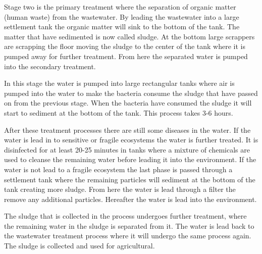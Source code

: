 Stage two is the primary treatment where the separation of organic matter (human waste) from the wastewater. By leading the wastewater into a large settlement tank the organic matter will sink to the bottom of the tank. The matter that have sedimented is now called sludge. At the bottom large scrappers are scrapping the floor moving the sludge to the center of the tank where it is pumped away for further treatment. From here the separated water is pumped into the secondary treatment. 

In this stage the water is pumped into large rectangular tanks where air is pumped into the water to make the bacteria consume the sludge that have passed on from the previous stage. When the bacteria have consumed the sludge it will start to sediment at the bottom of the tank. This process takes 3-6 hours.  

After these treatment processes there are still some diseases in the water. If the water is lead in to sensitive or fragile ecosystems the water is further treated. It is disinfected for at least 20-25 minutes in tanks where a mixture of chemicals are used to cleanse the remaining water before leading it into the environment. If the water is not lead to a fragile ecosystem the last phase is passed through a settlement tank where the remaining particles will sediment at the bottom of the tank creating more sludge. From here the water is lead through a filter the remove any additional particles. Hereafter the water is lead into the environment. 

The sludge that is collected in the process undergoes further treatment, where the remaining water in the sludge is separated from it. The water is lead back to the wastewater treatment process where it will undergo the same process again. The sludge is collected and used for agricultural.





